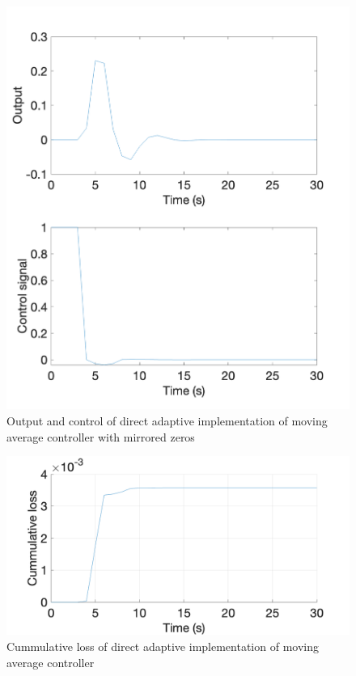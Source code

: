 \begin{figure}
	\centering
	\includegraphics[width=\textwidth]{images/sstr71.png}
	\caption{Output and control of direct adaptive implementation of moving average controller with mirrored zeros}
	\label{fig:sstr71}
\end{figure}

\begin{figure}
	\centering
	\includegraphics[width=\textwidth]{images/sstr72.png}
	\caption{Cummulative loss of direct adaptive implementation of moving average controller}
	\label{fig:sstr72}
\end{figure}

